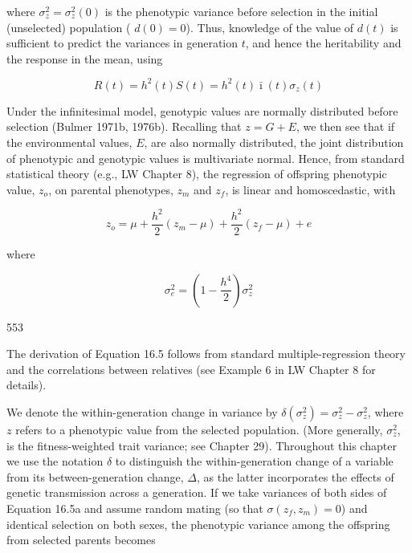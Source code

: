 \documentclass{article}
\begin{document}
where  $ \sigma_z^2 = \sigma_z^2(0) $ is the phenotypic variance before selection in the initial (unselected) population ( $ d(0) = 0 $). Thus, knowledge of the value of  $ d(t) $ is sufficient to predict the variances in generation  $ t $, and hence the heritability and the response in the mean, using

\begin{equation}
R(t)=h^{2}(t)S(t)=h^{2}(t)\bar{\imath}(t)\sigma_{z}(t)
\tag{16.4c}
\label{eq:16_4c}
\end{equation}

Under the infinitesimal model, genotypic values are normally distributed before selection (Bulmer 1971b, 1976b). Recalling that  $ z = G + E $, we then see that if the environmental values,  $ E $, are also normally distributed, the joint distribution of phenotypic and genotypic values is multivariate normal. Hence, from standard statistical theory (e.g., LW Chapter 8), the regression of offspring phenotypic value,  $ z_{o} $, on parental phenotypes,  $ z_{m} $ and  $ z_{f} $, is linear and homoscedastic, with

\begin{equation}
z_{o}=\mu+\frac{h^{2}}{2}(z_{m}-\mu)+\frac{h^{2}}{2}(z_{f}-\mu)+e
\tag{16.5a}
\label{eq:16_5a}
\end{equation}

where

\begin{equation}
\sigma_{e}^{2}=\left(1-\frac{h^{4}}{2}\right)\sigma_{z}^{2}
\tag{16.5b}
\label{eq:16_5b}
\end{equation}

553

The derivation of Equation 16.5 follows from standard multiple-regression theory and the correlations between relatives (see Example 6 in LW Chapter 8 for details).

We denote the within-generation change in variance by  $ \delta(\sigma_z^2) = \sigma_z^2 - \sigma_z^2 $, where  $ z $ refers to a phenotypic value from the selected population. (More generally,  $ \sigma_z^2 $, is the fitness-weighted trait variance; see Chapter 29). Throughout this chapter we use the notation  $ \delta $ to distinguish the within-generation change of a variable from its between-generation change,  $ \Delta $, as the latter incorporates the effects of genetic transmission across a generation. If we take variances of both sides of Equation 16.5a and assume random mating (so that  $ \sigma(z_f, z_m) = 0 $) and identical selection on both sexes, the phenotypic variance among the offspring from selected parents becomes
\end{document}
